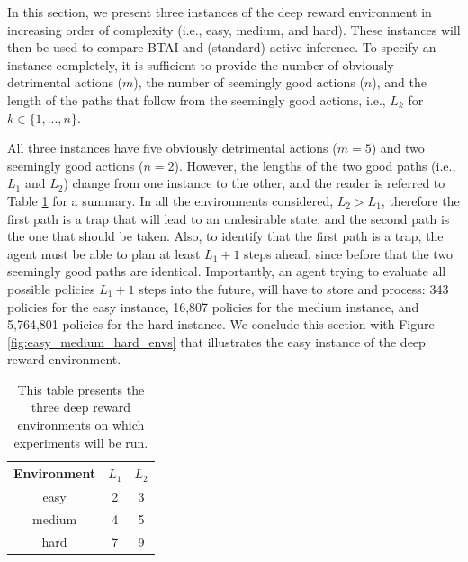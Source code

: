 \documentclass[twoside,11pt]{article}
\begin{document}
In this section, we present three instances of the deep reward environment in increasing order of complexity (i.e., easy, medium, and hard). These instances will then be used to compare BTAI and (standard) active inference. To specify an instance completely, it is sufficient to provide the number of obviously detrimental actions ($m$), the number of seemingly good actions ($n$), and the length of the paths that follow from the seemingly good actions, i.e., $L_k$ for $k \in \{1, ..., n\}$.

All three instances have five obviously detrimental actions ($m=5$) and two seemingly good actions ($n=2$). However, the lengths of the two good paths (i.e., $L_1$ and $L_2$) change from one instance to the other, and the reader is referred to Table \ref{tab:203} for a summary. In all the environments considered, $L_2 > L_1$, therefore the first path is a trap that will lead to an undesirable state, and the second path is the one that should be taken. Also, to identify that the first path is a trap, the agent must be able to plan at least $L_1 + 1$ steps ahead, since before that the two seemingly good paths are identical. Importantly, an agent trying to evaluate all possible policies $L_1 + 1$ steps into the future, will have to store and process: 343 policies for the easy instance, 16,807 policies for the medium instance, and 5,764,801 policies for the hard instance. We conclude this section with Figure \ref{fig:easy_medium_hard_envs} that illustrates the easy instance of the deep reward environment.

\begin{table}[H]
\centering
\begin{tabular}{ |c|c|c|  }
 \hline
 Environment & $L_1$ & $L_2$\\
 \hline
 easy & 2 & 3\\
 \hline
 medium & 4 & 5\\
 \hline
 hard & 7 & 9\\
 \hline
\end{tabular}
\caption{This table presents the three deep reward environments on which experiments will be run.}
\label{tab:203}
\end{table}
\end{document}
